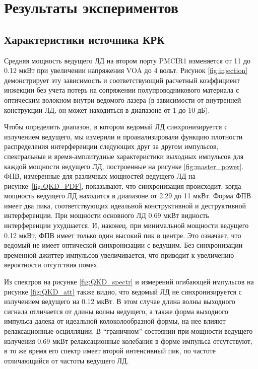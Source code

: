 \section{Результаты экспериментов}\label{ch:ch5/sect4}
\label{sec:results}

\subsection{Характеристики источника КРК}


Средняя мощность ведущего ЛД на втором порту PMCIR1 изменяется от 11 до 0.12 мкВт при увеличении напряжения VOA до 4 вольт. Рисунок \ref{fig:injection} демонстрирует эту зависимость и соответствующий расчетный коэффициент инжекции без учета потерь на сопряжении полупроводникового материала с оптическим волокном внутри ведомого лазера (в зависимости от внутренней конструкции ЛД, он может находиться в диапазоне от 1 до 10 дБ). 

Чтобы определить диапазон, в котором ведомый ЛД синхронизируется с излучением ведущего, мы измерили и проанализировали функцию плотности распределения интерференции следующих друг за другом импульсов, спектральные и время-амплитудные характеристики выходных импульсов для каждой мощности ведущего ЛД, построенные на рисунке \ref{fig:master_power}. ФПВ, измеренные для различных мощностей ведущего ЛД на рисунке~\ref{fig:QKD_PDF}, показывают, что синхронизация происходит, когда мощность ведущего ЛД находится в диапазоне от 2.29 до 11 мкВт. Форма ФПВ имеет два пика, соответствующих идеальной конструктивной и деструктивной интерференции. При мощности основного ЛД 0.69 мкВт видность интерференции ухудшается. И, наконец, при минимальной мощности ведущего 0.12 мкВт, ФПВ имеет только один высокий пик в центре. Это означает, что ведомый не имеет оптической синхронизации с ведущим. Без синхронизации временной джиттер импульсов увеличивается, что приводит к увеличению вероятности отсутствия помех.

Из спектров на рисунке \ref{fig:QKD_spectr} и измерений огибающей импульсов на рисунке \ref{fig:QKD_att} также видно, что ведомый ЛД не синхронизируется с излучением ведущего на 0.12 мкВт. В этом случае длина волны выходного сигнала отличается от длины волны ведущего, а также форма выходного импульса далека от идеальной колоколообразной формы, на нее влияют релаксационные осцилляции. В ``граничном'' состоянии при мощности ведущего излучения 0.69 мкВт релаксационные колебания в форме импульса отсутствуют, в то же время его спектр имеет второй интенсивный пик, по частоте отличающийся от частоты ведущего ЛД.

